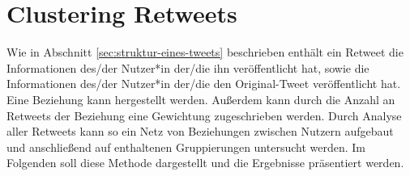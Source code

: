 \chapter{Clustering Retweets}
\label{chap:cluster_retweets}
Wie in Abschnitt \ref{sec:struktur-eines-tweets} beschrieben enthält ein \gls{Retweet} die Informationen des/der Nutzer*in der/die ihn veröffentlicht hat, sowie die Informationen des/der Nutzer*in der/die den Original-Tweet veröffentlicht hat. Eine Beziehung kann hergestellt werden. Außerdem kann durch die Anzahl an \glspl{Retweet} der Beziehung eine Gewichtung zugeschrieben werden. Durch Analyse aller \glspl{Retweet} kann so ein Netz von Beziehungen zwischen Nutzern aufgebaut und anschließend auf enthaltenen Gruppierungen untersucht werden. Im Folgenden soll diese Methode dargestellt und die Ergebnisse präsentiert werden.

